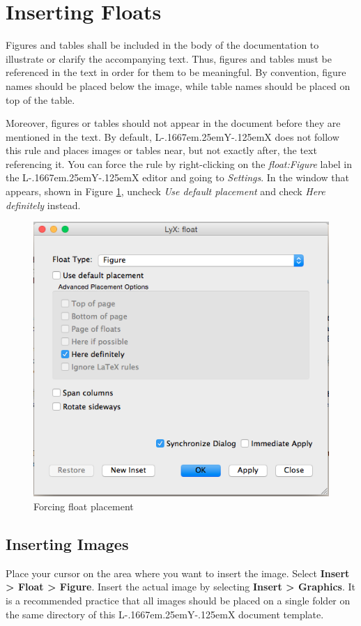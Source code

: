 \documentclass[english]{upeeei}
\makeatletter
\providecommand{\LyX}{L\kern-.1667em\lower.25em\hbox{Y}\kern-.125emX\@}
\makeatother
\begin{document}
\section{Inserting Floats}

Figures and tables shall be included in the body of the documentation
to illustrate or clarify the accompanying text. Thus, figures and
tables must be referenced in the text in order for them to be meaningful.
By convention, figure names should be placed below the image, while
table names should be placed on top of the table. 

Moreover, figures or tables should not appear in the document before
they are mentioned in the text. By default, \LyX{} does not follow
this rule and places images or tables near, but not exactly after,
the text referencing it. You can force the rule by right-clicking
on the \textit{float:Figure} label in the \LyX{} editor and going to
\textit{Settings}. In the window that appears, shown in Figure \ref{fig:Forcing-float-placement},
uncheck \textit{Use default placement} and check \textit{Here definitely}
instead.

\begin{figure}[H]
\begin{centering}
\includegraphics[width=0.5\columnwidth]{images/placement}
\par\end{centering}
\caption{Forcing float placement\label{fig:Forcing-float-placement}}

\end{figure}


\subsection{Inserting Images}

Place your cursor on the area where you want to insert the image.
Select \textbf{Insert \textgreater{} Float \textgreater{} Figure}.
Insert the actual image by selecting \textbf{Insert \textgreater{}
Graphics}. It is a recommended practice that all images should be
placed on a single folder on the same directory of this \LyX{} document
template.
\end{document}
